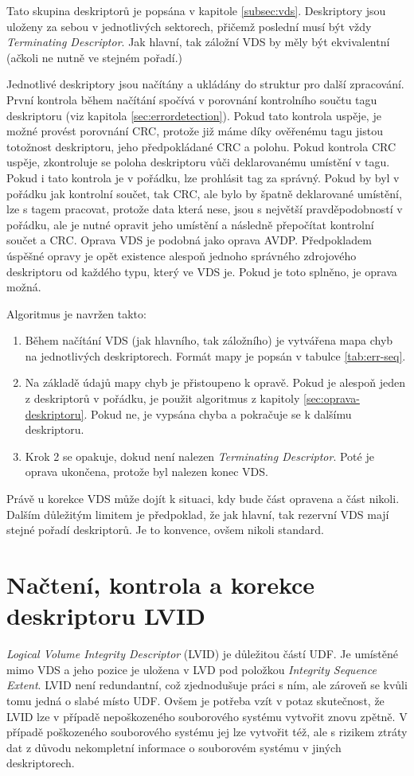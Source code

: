 Tato skupina deskriptorů je popsána v kapitole \ref{subsec:vds}. Deskriptory jsou uloženy za sebou v jednotlivých sektorech, přičemž poslední musí být vždy \textit{Terminating Descriptor}. Jak hlavní, tak záložní VDS by měly být ekvivalentní (ačkoli ne nutně ve stejném pořadí.)

Jednotlivé deskriptory jsou načítány a ukládány do struktur pro další zpracování. První kontrola během načítání spočívá v porovnání kontrolního součtu tagu deskriptoru (viz kapitola \ref{sec:errordetection}). Pokud tato kontrola uspěje, je možné provést porovnání CRC, protože již máme díky ověřenému tagu jistou totožnost deskriptoru, jeho předpokládané CRC a polohu. Pokud kontrola CRC uspěje, zkontroluje se poloha deskriptoru vůči deklarovanému umístění v tagu. Pokud i tato kontrola je v pořádku, lze prohlásit tag za správný. Pokud by byl v pořádku jak kontrolní součet, tak CRC, ale bylo by špatně deklarované umístění, lze s tagem pracovat, protože data která nese, jsou s největší pravděpodobností v pořádku, ale je nutné opravit jeho umístění a následně přepočítat kontrolní součet a CRC. 
Oprava VDS je podobná jako oprava AVDP. Předpokladem úspěšné opravy je opět existence alespoň jednoho správného zdrojového deskriptoru od každého typu, který ve VDS je. Pokud je toto splněno, je oprava možná.

Algoritmus je navržen takto:
\begin{enumerate}
    \item Během načítání VDS (jak hlavního, tak záložního) je vytvářena mapa chyb na jednotlivých deskriptorech. Formát mapy je popsán v tabulce \ref{tab:err-seq}. 
    \item Na základě údajů mapy chyb je přistoupeno k opravě. Pokud je alespoň jeden z deskriptorů v pořádku, je použit algoritmus z kapitoly \ref{sec:oprava-deskriptoru}. Pokud ne, je vypsána chyba a pokračuje se k dalšímu deskriptoru.
    \item Krok 2 se opakuje, dokud není nalezen \textit{Terminating Descriptor}. Poté je oprava ukončena, protože byl nalezen konec VDS.
\end{enumerate}
Právě u korekce VDS může dojít k situaci, kdy bude část opravena a část nikoli. Dalším důležitým limitem je předpoklad, že jak hlavní, tak rezervní VDS mají stejné pořadí deskriptorů. Je to konvence, ovšem nikoli standard.

\section{Načtení, kontrola a korekce deskriptoru LVID}
\label{sec:nacteni-a-oprava-lvid}
\textit{Logical Volume Integrity Descriptor} (LVID) je důležitou částí UDF. Je umístěné mimo VDS a jeho pozice je uložena v LVD pod položkou \textit{Integrity Sequence Extent}. LVID není redundantní, což zjednodušuje práci s ním, ale zároveň se kvůli tomu jedná o slabé místo UDF. Ovšem je potřeba vzít v potaz skutečnost, že LVID lze v případě nepoškozeného souborového systému vytvořit znovu zpětně. V případě poškozeného souborového systému jej lze vytvořit též, ale s rizikem ztráty dat z důvodu nekompletní informace o souborovém systému v jiných deskriptorech.

